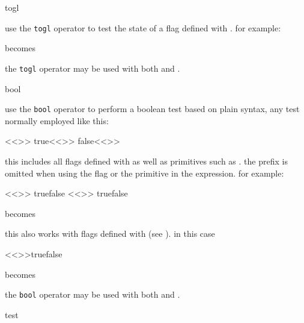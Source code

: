 \begin{marglist}
\appto\marglistfont{\verbatimfont}

\item[togl]

use the \texttt{togl} operator to test the state of a flag defined with . for example:

%
becomes

\begin{ltxcode}
\end{ltxcode}
%
the \texttt{togl} operator may be used with both  and .

\item[bool]

use the \texttt{bool} operator to perform a boolean test based on plain \tex syntax, \ie any test normally employed like this:

\begin{ltxcode}
<<\iftest>> true<<\else>> false<<\fi>>
\end{ltxcode}
%
this includes all flags defined with  as well as \tex primitives such as . the  prefix is omitted when using the flag or the primitive in the expression. for example:

\begin{ltxcode}
<<\ifmmode>> true\else false\fi
<<\ifmytest>> true\else false\fi
\end{ltxcode}
%
becomes

\begin{ltxcode}
\end{ltxcode}
%
this also works with flags defined with  (see ). in this case

\begin{ltxcode}
<<>>{true}{false}
\end{ltxcode}
%
becomes

\begin{ltxcode}
\end{ltxcode}
%
the \texttt{bool} operator may be used with both  and . 

\item[test]


\end{marglist}
